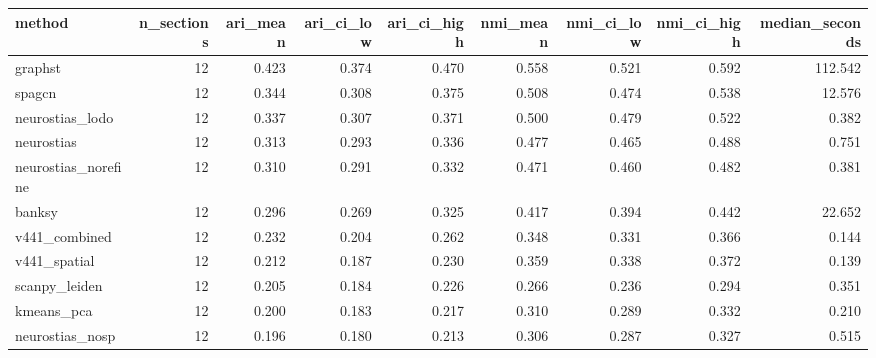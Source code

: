 \begin{tabular}{lrrrrrrrr}
\toprule
method & n_sections & ari_mean & ari_ci_low & ari_ci_high & nmi_mean & nmi_ci_low & nmi_ci_high & median_seconds \\
\midrule
graphst & 12 & 0.423 & 0.374 & 0.470 & 0.558 & 0.521 & 0.592 & 112.542 \\
spagcn & 12 & 0.344 & 0.308 & 0.375 & 0.508 & 0.474 & 0.538 & 12.576 \\
neurostias_lodo & 12 & 0.337 & 0.307 & 0.371 & 0.500 & 0.479 & 0.522 & 0.382 \\
neurostias & 12 & 0.313 & 0.293 & 0.336 & 0.477 & 0.465 & 0.488 & 0.751 \\
neurostias_norefine & 12 & 0.310 & 0.291 & 0.332 & 0.471 & 0.460 & 0.482 & 0.381 \\
banksy & 12 & 0.296 & 0.269 & 0.325 & 0.417 & 0.394 & 0.442 & 22.652 \\
v441_combined & 12 & 0.232 & 0.204 & 0.262 & 0.348 & 0.331 & 0.366 & 0.144 \\
v441_spatial & 12 & 0.212 & 0.187 & 0.230 & 0.359 & 0.338 & 0.372 & 0.139 \\
scanpy_leiden & 12 & 0.205 & 0.184 & 0.226 & 0.266 & 0.236 & 0.294 & 0.351 \\
kmeans_pca & 12 & 0.200 & 0.183 & 0.217 & 0.310 & 0.289 & 0.332 & 0.210 \\
neurostias_nosp & 12 & 0.196 & 0.180 & 0.213 & 0.306 & 0.287 & 0.327 & 0.515 \\
\bottomrule
\end{tabular}
